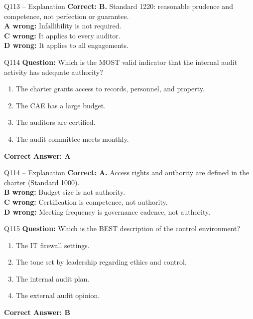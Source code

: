 \documentclass[aspectratio=169,10pt]{beamer}
\begin{document}
	\begin{frame}[t]{Q113 -- Explanation}
		\small
		\textbf{Correct: B.} Standard 1220: reasonable prudence and competence, not perfection or guarantee. \\[4pt]
		\textbf{A wrong:} Infallibility is not required. \\[2pt]
		\textbf{C wrong:} It applies to every auditor. \\[2pt]
		\textbf{D wrong:} It applies to all engagements.
	\end{frame}
	
	\begin{frame}[t]{Q114}
		\small
		\textbf{Question:} Which is the MOST valid indicator that the internal audit activity has adequate authority?
		\begin{enumerate}[label=\Alph*.,itemsep=1pt,topsep=2pt]
			\item The charter grants access to records, personnel, and property.
			\item The CAE has a large budget.
			\item The auditors are certified.
			\item The audit committee meets monthly.
		\end{enumerate}
		\vspace{4pt}
		\textbf{Correct Answer: A}
	\end{frame}
	
	\begin{frame}[t]{Q114 -- Explanation}
		\small
		\textbf{Correct: A.} Access rights and authority are defined in the charter (Standard 1000). \\[4pt]
		\textbf{B wrong:} Budget size is not authority. \\[2pt]
		\textbf{C wrong:} Certification is competence, not authority. \\[2pt]
		\textbf{D wrong:} Meeting frequency is governance cadence, not authority.
	\end{frame}
	
	\begin{frame}[t]{Q115}
		\small
		\textbf{Question:} Which is the BEST description of the control environment?
		\begin{enumerate}[label=\Alph*.,itemsep=1pt,topsep=2pt]
			\item The IT firewall settings.
			\item The tone set by leadership regarding ethics and control.
			\item The internal audit plan.
			\item The external audit opinion.
		\end{enumerate}
		\vspace{4pt}
		\textbf{Correct Answer: B}
	\end{frame}
	
\end{document}

